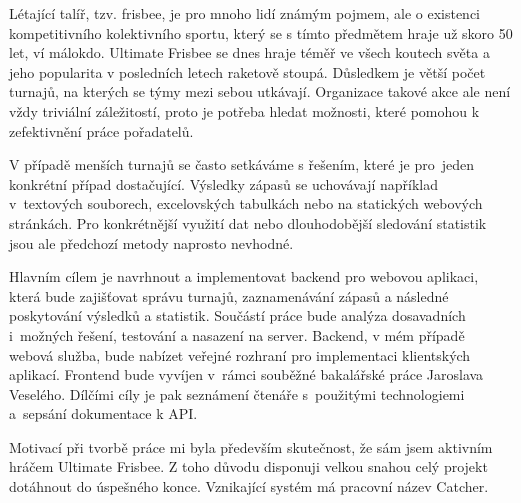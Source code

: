 \begin{introduction}
 Létající talíř, tzv. frisbee, je pro mnoho lidí známým pojmem, ale o existenci kompetitivního kolektivního sportu,
 který se s tímto předmětem hraje už skoro 50 let, ví málokdo. Ultimate Frisbee se dnes hraje téměř
 ve všech koutech světa a jeho popularita v posledních letech raketově stoupá. Důsledkem je větší počet turnajů, na kterých se týmy mezi sebou utkávají.
 Organizace takové akce ale není vždy triviální záležitostí, proto je potřeba hledat možnosti, které pomohou k zefektivnění práce pořadatelů.
 
 V případě menších turnajů se často setkáváme s řešením, které je pro~jeden konkrétní případ dostačující.
 Výsledky zápasů se uchovávají například v~textových souborech, excelovských tabulkách nebo na statických webových stránkách.
 Pro konkrétnější využití dat nebo dlouhodobější sledování statistik jsou ale předchozí metody naprosto nevhodné.
 
 Hlavním cílem je navrhnout a implementovat backend pro webovou aplikaci, která bude zajišťovat správu turnajů, zaznamenávání
 zápasů a následné poskytování výsledků a statistik. Sou\-částí práce bude analýza dosavadních
 i~možných řešení, testování a nasazení na server. Backend, v mém případě webová služba, bude
 nabízet veřejné rozhraní pro implementaci klientských aplikací.
 Frontend bude vyvíjen v~rámci souběžné bakalářské práce Jaroslava Veselého.
 Dílčími cíly je pak seznámení čtenáře s~použitými technologiemi a~sepsání dokumentace k API.
 
 Motivací při tvorbě práce mi byla především skutečnost, že sám jsem aktivním hráčem Ultimate Frisbee.
 Z toho důvodu disponuji velkou snahou celý projekt dotáhnout do úspešného konce. Vznikající systém má pracovní název Catcher.
\end{introduction}